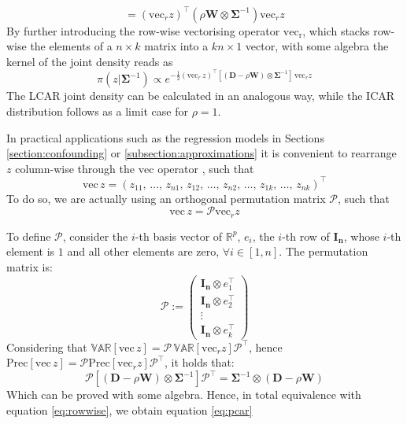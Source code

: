 \documentclass[openany, 11pt, oneside]{book}
\begin{document}
\begin{subappendices}
$$%
=(\mathrm{vec}_r z) ^{\top} \left( \rho \boldsymbol{W} \otimes \boldsymbol{\Sigma}^{-1} \right) \mathrm{vec}_r z
$$
By further introducing the row-wise vectorising operator $\mathrm{vec_r}$, which stacks row-wise the elements of a $n \times k$ matrix into a $kn \times 1$ vector, with some algebra \parencite[see also][]{Mardia, Banerjee, Gelfand} the kernel of the joint density reads as
%
\begin{equation}
 \pi(z  \vert \boldsymbol{\Sigma}^{-1}) \propto e^{
 -\frac{1}{2} (\mathrm{vec}_r\,z)^{\top} 
 \left[(\boldsymbol{D} - \rho \boldsymbol{W}) \otimes \boldsymbol{\Sigma}^{-1}\right]\, \mathrm{vec}_rz
 }
\label{eq:rowwise}
\end{equation}
%
The LCAR joint density can be calculated in an analogous way, while the ICAR distribution follows as a limit case for $\rho=1$.

In practical applications such as the regression models in Sections \ref{section:confounding} or \ref{subsection:approximations} it is convenient to rearrange $z$ column-wise through the $\mathrm{vec}$ operator \cite{INLAMSM}, such that 
$$
\mathrm{vec}\,z = (z_{11},\, \ldots, \,z_{n1},\, z_{12},\, \ldots,\, z_{n2},\, \ldots ,\, z_{1k}, \,\ldots, \,z_{nk} )^{\top}
$$
To do so, we are actually using an orthogonal permutation matrix $\mathcal{P}$, such that 
$$\mathrm{vec}\,z = \mathcal{P} \mathrm{vec}_r z $$

To define $\mathcal{P}$, consider the $i$-th basis vector of $\mathbb{R}^p$, $e_i$, the $i$-th row of $\boldsymbol{I_{n}}$, whose $i$-th element is $1$ and all other elements are zero, $\forall i \in [1,n]$. The permutation matrix is:
$$
\mathcal{P}  := \begin{pmatrix} 
\boldsymbol{I_{n}} \otimes e_1^{\top} \\ \boldsymbol{I_{n}} \otimes e_2^{\top} \\ \vdots \\ \boldsymbol{I_{n}} \otimes e_k^{\top}
\end{pmatrix}
$$
%
Considering that $\mathbb{VAR}[\mathrm{vec}\, z] = \mathcal{P} \,\mathbb{VAR}[\mathrm{vec}_rz] \mathcal{P}^{\top}$, hence $\mathrm{Prec}[\mathrm{vec}\, z] = \mathcal{P} \mathrm{Prec}[\mathrm{vec}_r z] \mathcal{P}^\top$, it holds that:
$$
\mathcal{P} \left[\left( \boldsymbol{D} - \rho\boldsymbol{W}\right)\otimes \boldsymbol{\Sigma}^{-1} \right] \mathcal{P}^{\top}= \boldsymbol{\Sigma}^{-1} \otimes \left( \boldsymbol{D} - \rho\boldsymbol{W}\right)
$$
Which can be proved with some algebra. Hence, in total equivalence with equation \ref{eq:rowwise}, we obtain equation \ref{eq:pcar}
 \label{appendix:icar}

\end{subappendices}
\end{document}
